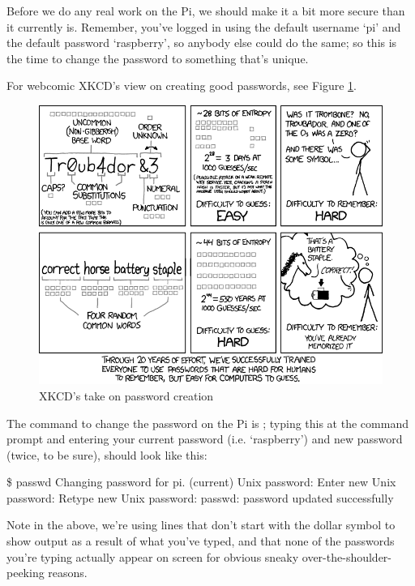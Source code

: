 Before we do any real work on the Pi, we should make it a bit more secure than it currently is. Remember, you've logged in using the default username `pi' and the default password `raspberry', so anybody else could do the same; so this is the time to change the password to something that's unique.

For webcomic XKCD's view on creating good passwords, see Figure \ref{figure:xkcd-password}.

\begin{figure}
\centerline{\includegraphics[width=13.5cm]{images/xkcd-password-strength}}
\caption{XKCD's take on password creation }\label{figure:xkcd-password}
\end{figure}

The command to change the password on the Pi is ; typing this at the command prompt and entering your current password (i.e. `raspberry') and new password (twice, to be sure), should look like this:

\begin{ttoutenv}
\$ passwd
Changing password for pi.
(current) Unix password:
Enter new Unix password:
Retype new Unix password:
passwd: password updated successfully
\end{ttoutenv}


\noindent Note in the above, we're using lines that don't start with the dollar symbol to show output as a result of what you've typed, and that none of the passwords you're typing actually appear on screen for obvious sneaky over-the-shoulder-peeking reasons.


